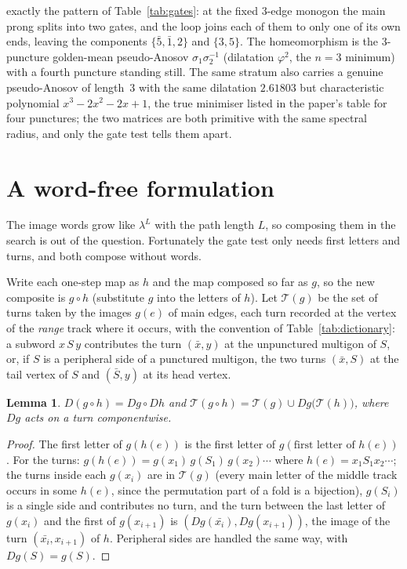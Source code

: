 \documentclass[12pt]{amsart}
\newcommand{\anti}[1]{\bar{#1}}          %
\newcommand{\Dg}{D}                       %
\newcommand{\turns}{\mathcal{T}}
\newcommand{\lam}{\lambda}
\newcommand{\set}[1]{\{#1\}}
\theoremstyle{plain}
\newtheorem{Lemma}[Theorem]{Lemma}
\theoremstyle{definition}
\begin{document}
\noindent
exactly the pattern of Table~\ref{tab:gates}: at the fixed 3-edge
monogon the main prong splits into two gates, and the loop joins each of
them to only one of its own ends, leaving the components
$\set{\anti5,\anti1,2}$ and $\set{3,5}$.  The homeomorphism is the
3-puncture golden-mean pseudo-Anosov $\sigma_1\sigma_2^{-1}$ (dilatation
$\varphi^2$, the $n=3$ minimum) with a fourth puncture standing still.
The same stratum also carries a genuine pseudo-Anosov of length~$3$ with
the same dilatation $2.61803$ but characteristic polynomial
$x^3-2x^2-2x+1$, the true minimiser listed in the paper's table for four
punctures; the two matrices are both primitive with the same spectral
radius, and only the gate test tells them apart.

\section{A word-free formulation}
\label{sec:wordfree}

The image words grow like $\lam^L$ with the path length $L$, so composing
them in the search is out of the question.  Fortunately the gate test only
needs first letters and turns, and both compose without words.

Write each one-step map as $h$ and the map composed so far as $g$, so the
new composite is $g\circ h$ (substitute $g$ into the letters of $h$).  Let
$\turns(g)$ be the set of turns taken by the images $g(e)$ of main edges,
each turn recorded at the vertex of the \emph{range} track where it
occurs, with the convention of Table~\ref{tab:dictionary}: a subword $x\,S\,y$
contributes the turn $(\anti x,y)$ at the unpunctured multigon of $S$, or,
if $S$ is a peripheral side of a punctured multigon, the two turns
$(\anti x,S)$ at the tail vertex of $S$ and $(\anti S,y)$ at its head
vertex.

\begin{Lemma}
  \label{lem:compose}
  $\Dg(g\circ h) = \Dg g\circ \Dg h$ and
  $\turns(g\circ h) = \turns(g)\cup \Dg g\bigl(\turns(h)\bigr)$, where
  $\Dg g$ acts on a turn componentwise.
\end{Lemma}
\begin{proof}
  The first letter of $g(h(e))$ is the first letter of $g(\text{first
  letter of }h(e))$.  For the turns: $g(h(e)) = g(x_1)\,g(S_1)\,g(x_2)\cdots$
  where $h(e) = x_1S_1x_2\cdots$; the turns inside each $g(x_i)$ are in
  $\turns(g)$ (every main letter of the middle track occurs in some
  $h(e)$, since the permutation part of a fold is a bijection), $g(S_i)$ is
  a single side and contributes no turn, and the turn between the last
  letter of $g(x_i)$ and the first of $g(x_{i+1})$ is $(\Dg g(\anti{x_i}),
  \Dg g(x_{i+1}))$, the image of the turn $(\anti{x_i},x_{i+1})$ of $h$.
  Peripheral sides are handled the same way, with $\Dg g(S) = g(S)$.
\end{proof}
\end{document}
